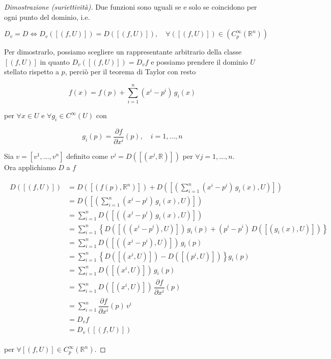 \begin{proof}[Dimostrazione (suriettività)]
	Due funzioni sono uguali se e solo se coincidono per ogni punto del dominio, i.e.
	
	\begin{equation}
		D_{v} = D \iff D_{v}([(f,U)]) = D([(f,U)]), \quad \forall ([(f,U)]) \in (C_{p}^{\infty}(\mathbb{R}^{n}))
	\end{equation}

	Per dimostrarlo, possiamo scegliere un rappresentante arbitrario della classe $ [(f,U)] $ in quanto $ D_{v}([(f,U)]) = D_{v} f $ e possiamo prendere il dominio $ U $ stellato rispetto a $ p $, perciò per il teorema di Taylor con resto
	
	\begin{equation}
		f(x) = f(p) + \sum_{i=1}^{n} (x^{i}-p^{i}) \, g_{i}(x)
	\end{equation}

	per $ \forall x \in U $ e $ \forall g_{i} \in C^{\infty}(U) $ con
	
	\begin{equation}
		g_{i}(p) = \dfrac{\partial f}{\partial x^{i}} (p), \quad i=1,\dots,n
	\end{equation}

	Sia $ v = [v^{1},\dots,v^{n}] $ definito come $ v^{j} = D([(x^{j},\mathbb{R})]) $ per $ \forall j=1,\dots,n $.\\
	Ora applichiamo $ D $ a $ f $
	
	\begin{align}
		\begin{split}
			D ([(f,U)]) &= D ([(f(p),\mathbb{R}^{n})]) + D \left(\left[\left( \sum_{i=1}^{n} (x^{i}-p^{i}) \, g_{i}(x) , U \right)\right]\right)\\
			&= D \left(\left[\left( \sum_{i=1}^{n} (x^{i}-p^{i}) \, g_{i}(x) , U \right)\right]\right)\\
			&= \sum_{i=1}^{n} D ([( (x^{i}-p^{i}) \, g_{i}(x) , U )])\\
			&= \sum_{i=1}^{n} \left\{ D ([( (x^{i}-p^{i}), U )]) \, g_{i}(p) + (p^{i}-p^{i}) \, D ([( g_{i}(x), U )]) \right\}\\
			&= \sum_{i=1}^{n} D ([( (x^{i}-p^{i}), U )]) \, g_{i}(p)\\
			&= \sum_{i=1}^{n} \left\{ D ([( x^{i}, U )]) - D ([( p^{i}, U )]) \right\} g_{i}(p)\\
			&= \sum_{i=1}^{n} D ([( x^{i}, U )]) \, g_{i}(p)\\
			&= \sum_{i=1}^{n} D ([( x^{i}, U )]) \, \dfrac{\partial f}{\partial x^{i}} (p)\\
			&= \sum_{i=1}^{n} \dfrac{\partial f}{\partial x^{i}} (p) \, v^{i}\\
			&= D_{v} f\\
			&= D_{v} ([(f,U)])
		\end{split}
	\end{align}

	per $ \forall [(f,U)] \in C_{p}^{\infty}(\mathbb{R}^{n}) $.
\end{proof}

